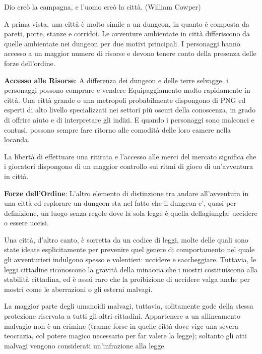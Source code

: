 \documentclass[a4paper,11pt,twoside,openany]{book}
\begin{document}
\label{avventure-in-citta}
\begin{tcolorbox}[enhanced,arc=5pt,boxrule=0.3pt]{Dio creò la campagna, e l'uomo creò la città. (William Cowper)}\end{tcolorbox}\medskip

A prima vista, una città è molto simile a un dungeon, in quanto è composta da pareti, porte, stanze e corridoi. Le avventure ambientate in città differiscono da quelle ambientate nei dungeon per due motivi principali. I personaggi hanno accesso a un maggior numero di risorse e devono tenere conto della presenza delle forze dell'ordine.

\textbf{Accesso alle Risorse}: A differenza dei dungeon e delle terre selvagge, i personaggi possono comprare e vendere Equipaggiamento molto rapidamente in città. Una città grande o una metropoli probabilmente dispongono di PNG ed esperti di alto livello specializzati nei settori più oscuri della conoscenza, in grado di offrire aiuto e di interpretare gli indizi. E quando i personaggi sono malconci e contusi, possono sempre fare ritorno alle comodità delle loro camere nella locanda.

La libertà di effettuare una ritirata e l'accesso alle merci del mercato significa che i giocatori dispongono di un maggior controllo sui ritmi di gioco di un'avventura in città.

\textbf{Forze dell'Ordine}: L'altro elemento di distinzione tra andare all'avventura in una città ed esplorare un dungeon sta nel fatto che il dungeon e', quasi per definizione, un luogo senza regole dove la sola legge è quella dellagiungla: uccidere o essere uccisi.

Una città, d'altro canto, è sorretta da un codice di leggi, molte delle quali sono state ideate esplicitamente per prevenire quel genere di comportamento nel quale gli avventurieri indulgono spesso e volentieri: uccidere e saccheggiare. Tuttavia, le leggi cittadine riconoscono la gravità della minaccia che i mostri costituiscono alla stabilità cittadina, ed è assai raro che la proibizione di uccidere valga anche per mostri come le aberrazioni o gli esterni malvagi.

La maggior parte degli umanoidi malvagi, tuttavia, solitamente gode della stessa protezione riservata a tutti gli altri cittadini. Appartenere a un allineamento malvagio non è un crimine (tranne forse in quelle città dove vige una severa teocrazia, col potere magico necessario per far valere la legge); soltanto gli atti malvagi vengono considerati un'infrazione alla legge.
\end{document}
